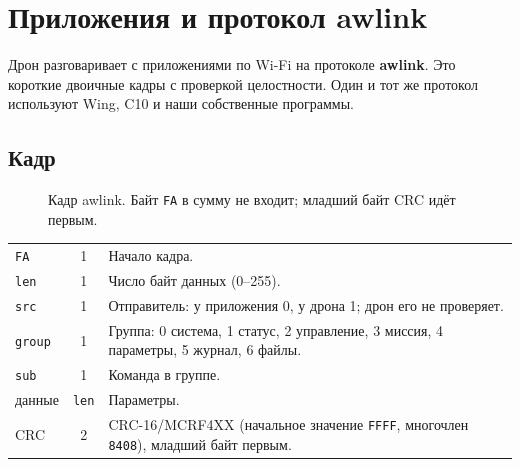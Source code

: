 \chapter{Приложения и протокол awlink}\label{ch:app}

Дрон разговаривает с приложениями по Wi-Fi на протоколе \textbf{awlink}. Это короткие двоичные кадры с проверкой целостности. Один и тот же протокол используют Wing, C10 и наши собственные программы.

\section{Кадр}

\begin{figure}[tbp]
\centering
{}
\caption{Кадр awlink. Байт \texttt{FA} в сумму не входит; младший байт CRC идёт первым.}\label{fig:awlink}
\end{figure}

\begin{tabularx}{\textwidth}{@{}l c Y@{}}
\toprule
{} &  &  \\ \midrule
\texttt{FA} & 1 & Начало кадра. \\
\texttt{len} & 1 & Число байт данных (0--255). \\
\texttt{src} & 1 & Отправитель: у приложения 0, у дрона 1; дрон его не проверяет. \\
\texttt{group} & 1 & Группа: 0 система, 1 статус, 2 управление, 3 миссия, 4 параметры, 5 журнал, 6 файлы. \\
\texttt{sub} & 1 & Команда в группе. \\
данные & \texttt{len} & Параметры. \\
CRC & 2 & CRC-16/MCRF4XX (начальное значение \texttt{FFFF}, многочлен \texttt{8408}), младший байт первым. \\ \bottomrule
\end{tabularx}

